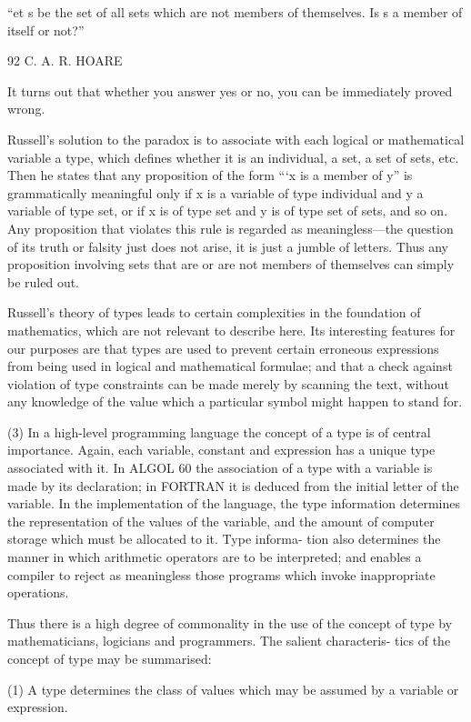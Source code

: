 “et s be the set of all sets which are not members of themselves. Is s a member of itself or not?”

92 C. A. R. HOARE

It turns out that whether you answer yes or no, you can be immediately proved wrong.

Russell’s solution to the paradox is to associate with each logical or mathematical variable a type, which defines whether it is an individual, a set, a set of sets, etc. Then he states that any proposition of the form “‘x is a member of y” is grammatically meaningful only if x is a variable of type individual and y a variable of type set, or if x is of type set and y is of type set of sets, and so on. Any proposition that violates this rule is regarded as meaningless—the question of its truth or falsity just does not arise, it is just a jumble of letters. Thus any proposition involving sets that are or are not members of themselves can simply be ruled out.

Russell’s theory of types leads to certain complexities in the foundation of mathematics, which are not relevant to describe here. Its interesting features for our purposes are that types are used to prevent certain erroneous expressions from being used in logical and mathematical formulae; and that a check against violation of type constraints can be made merely by scanning the text, without any knowledge of the value which a particular symbol might happen to stand for.

(3) In a high-level programming language the concept of a type is of central importance. Again, each variable, constant and expression has a unique type associated with it. In ALGOL 60 the association of a type with a variable is made by its declaration; in FORTRAN it is deduced from the initial letter of the variable. In the implementation of the language, the type information determines the representation of the values of the variable, and the amount of computer storage which must be allocated to it. Type informa- tion also determines the manner in which arithmetic operators are to be interpreted; and enables a compiler to reject as meaningless those programs which invoke inappropriate operations.

Thus there is a high degree of commonality in the use of the concept of type by mathematicians, logicians and programmers. The salient characteris- tics of the concept of type may be summarised:

(1) A type determines the class of values which may be assumed by a variable or expression.

